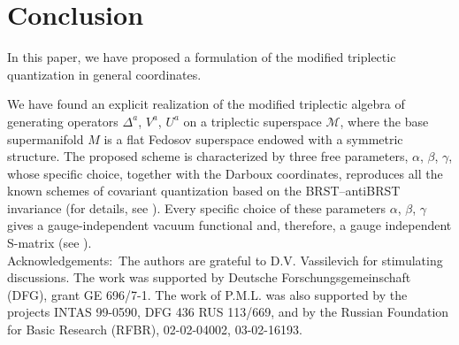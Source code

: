 \documentclass[a4paper,11pt]{article}
\begin{document}
\section{Conclusion}

In this paper, we have proposed a formulation of the modified triplectic
quantization in general coordinates.

We have found an explicit realization of the modified triplectic algebra of
generating operators $\Delta ^{a}$, $V^{a}$, $U^{a}$ on a triplectic
superspace $\mathcal{M}$, where the base supermanifold $M$ is a flat Fedosov
superspace endowed with a symmetric structure. The proposed scheme is
characterized by three free parameters, $\alpha$, $\beta$, $\gamma$,
whose specific choice, together with the Darboux coordinates, reproduces all
the known schemes of covariant quantization based on the BRST--antiBRST
invariance (for details, see \cite{gln}). Every specific choice of these
parameters $\alpha $, $\beta$, $\gamma$ gives a gauge-independent vacuum
functional and, therefore, a gauge independent S-matrix (see \cite{t}).\\

{\sc Acknowledgements:}~The authors are grateful to D.V. Vassilevich for
stimulating discussions. The work was supported by Deutsche
Forschungsgemeinschaft (DFG), grant GE 696/7-1. The work of P.M.L. was also
supported by the projects INTAS 99-0590, DFG 436 RUS 113/669, and by the
Russian Foundation for Basic Research (RFBR), 02-02-04002, 03-02-16193.

\end{document}
